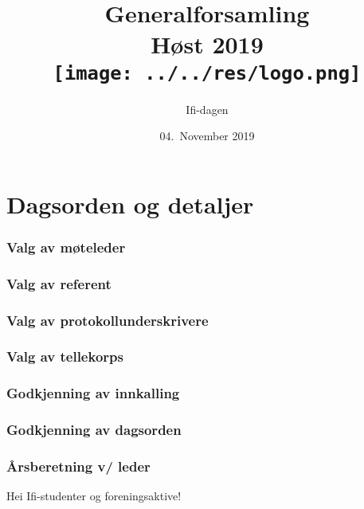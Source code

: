 \documentclass[10pt,norsk,a4paper]{article}
\title{Generalforsamling \\
	Høst 2019\\[3cm]
	\texttt{[image: ../../res/logo.png]}\\}
\date{04.\ November 2019}
\author{Ifi-dagen}
\begin{document}
\maketitle{}
\newpage
\part{Dagsorden og detaljer}
\tableofcontents{}
\newpage


\section{Valg av møteleder}

\section{Valg av referent}

\section{Valg av protokollunderskrivere}

\section{Valg av tellekorps}

\section{Godkjenning av innkalling}

\section{Godkjenning av dagsorden}

\section{Årsberetning v/ leder}
Hei Ifi-studenter og foreningsaktive!
\end{document}
